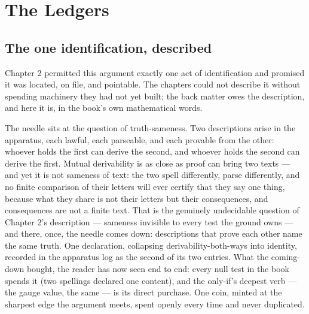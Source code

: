 \chapter*{The Ledgers}

\section*{The one identification, described}

Chapter 2 permitted this argument exactly one act of identification and promised it
was located, on file, and pointable. The chapters could not describe it without
spending machinery they had not yet built; the back matter owes the description, and
here it is, in the book's own mathematical words.

The needle sits at the question of truth-sameness. Two descriptions arise in the
apparatus, each lawful, each parseable, and each provable from the other: whoever
holds the first can derive the second, and whoever holds the second can derive the
first. Mutual derivability is as close as proof can bring two texts --- and yet it
is not sameness of text: the two spell differently, parse differently, and no
finite comparison of their letters will ever certify that they say one thing,
because what they share is not their letters but their consequences, and
consequences are not a finite text. That is the genuinely undecidable question of
Chapter 2's description --- sameness invisible to every test the ground owns ---
and there, once, the needle comes down: descriptions that prove each other name
the same truth. One declaration, collapsing derivability-both-ways into identity,
recorded in the apparatus log as the second of its two entries. What the
coming-down bought, the reader has now seen end to end: every null test in the
book spends it (two spellings declared one content), and the only-if's deepest
verb --- the gauge value, the same --- is its direct purchase. One coin, minted at
the sharpest edge the argument meets, spent openly every time and never
duplicated.

